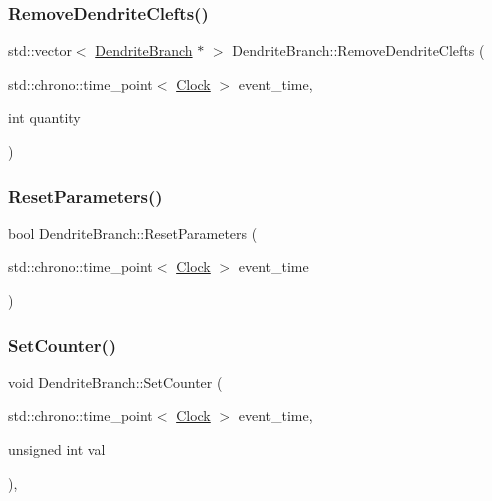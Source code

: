 \mbox{\label{classDendriteBranch_acd54003e5acb9abda7d7a42f248c14b0}} 
\subsubsection{\texorpdfstring{Remove\+Dendrite\+Clefts()}{RemoveDendriteClefts()}}
{\footnotesize\ttfamily std\+::vector$<$ \mbox{\hyperlink{classDendriteBranch}{Dendrite\+Branch}} $\ast$ $>$ Dendrite\+Branch\+::\+Remove\+Dendrite\+Clefts (\begin{DoxyParamCaption}\item[{std\+::chrono\+::time\+\_\+point$<$ \mbox{\hyperlink{universe_8h_a0ef8d951d1ca5ab3cfaf7ab4c7a6fd80}{Clock}} $>$}]{event\+\_\+time,  }\item[{int}]{quantity }\end{DoxyParamCaption})}

\mbox{\label{classDendriteBranch_a70b5e63fc44166ccd7f0c7177660c250}} 
\subsubsection{\texorpdfstring{Reset\+Parameters()}{ResetParameters()}}
{\footnotesize\ttfamily bool Dendrite\+Branch\+::\+Reset\+Parameters (\begin{DoxyParamCaption}\item[{std\+::chrono\+::time\+\_\+point$<$ \mbox{\hyperlink{universe_8h_a0ef8d951d1ca5ab3cfaf7ab4c7a6fd80}{Clock}} $>$}]{event\+\_\+time }\end{DoxyParamCaption})}

\mbox{\label{classDendriteBranch_a2ce03fbad4a70564eeaafb62debd4d74}} 
\subsubsection{\texorpdfstring{Set\+Counter()}{SetCounter()}}
{\footnotesize\ttfamily void Dendrite\+Branch\+::\+Set\+Counter (\begin{DoxyParamCaption}\item[{std\+::chrono\+::time\+\_\+point$<$ \mbox{\hyperlink{universe_8h_a0ef8d951d1ca5ab3cfaf7ab4c7a6fd80}{Clock}} $>$}]{event\+\_\+time,  }\item[{unsigned int}]{val }\end{DoxyParamCaption})\hspace{0.3cm}{\ttfamily [inline]}, {\ttfamily [virtual]}}



